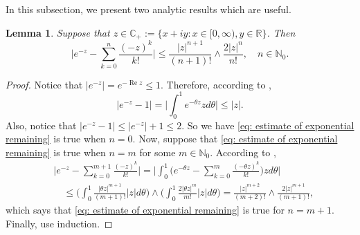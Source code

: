 \documentclass[12pt,oneside,english]{amsart}
\theoremstyle{plain}
\newtheorem{lem}[thm]{Lemma}
\theoremstyle{definition}
\numberwithin{equation}{section}
\begin{document}
\subsection{}
    In this subsection, we present two analytic results which are useful.
\begin{lem}
\label{lem: estimate of exponential remaining}
    Suppose that $z\in \mathbb C_+:= \{x+iy: x \in [0,\infty), y \in \mathbb R\}$. Then
\begin{equation}
\label{eq: estimate of exponential remaining}
    \Big|e^{-z} - \sum_{k=0}^n \frac{(-z)^k}{k!} \Big|
    \leq \frac{|z|^{n+1}}{(n+1)!} \wedge \frac{2|z|^{n}}{n!}, \quad n\in \mathbb N_0.
\end{equation}
\end{lem}
\begin{proof}
    Notice that $|e^{-z}| = e^{- \operatorname{Re} z} \leq 1$.
    Therefore, according to \cite[Theorem 7.20.]{Rudin1987Real},
\begin{equation}
    |e^{-z} - 1| = \Big| \int_0^1 e^{-\theta z} z d\theta\Big|
    \leq |z|.
\end{equation}
    Also, notice that $|e^{-z} - 1| \leq |e^{-z}|+1 \leq 2$.
    So we have \eqref{eq: estimate of exponential remaining} is true when $n = 0$.
    Now, suppose that \eqref{eq: estimate of exponential remaining} is true when $n = m$ for some $m \in \mathbb N_0$.
    According to \cite[Theorem 7.20.]{Rudin1987Real},
\begin{align}
    &\Big|e^{-z} - \sum_{k=0}^{m+1} \frac{(-z)^k}{k!}\Big|
    = \Big| \int_0^1\Big(e^{-\theta z} - \sum_{k=0}^m \frac{(-\theta z)^k}{k!} \Big) z d\theta \Big|
    \\&\quad \leq  \Big(\int_0^1 \frac{|\theta z|^{m+1}}{(m+1)!} |z| d\theta\Big) \wedge \Big(\int_0^1 \frac{2|\theta z|^{m}}{m!} |z| d\theta\Big)
    = \frac{|z|^{m+2}}{(m+2)!} \wedge \frac{2|z|^{m+1}}{(m+1)!},
\end{align}
    which says that \eqref{eq: estimate of exponential remaining} is true for $n = m + 1$.
    Finally, use induction.
\end{proof}
\end{document}
